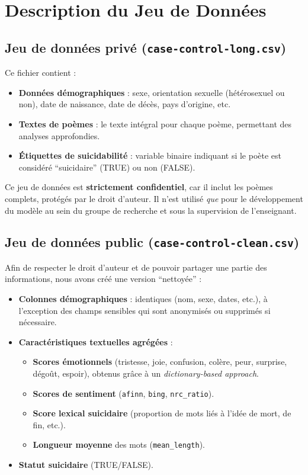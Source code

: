 \documentclass[12pt,a4paper]{article}
\begin{document}
	\section{Description du Jeu de Données}
	\label{sec:dataset_description}
	
	\subsection{Jeu de données privé (\texttt{case-control-long.csv})}
	Ce fichier contient :
	\begin{itemize}
		\item \textbf{Données démographiques} : sexe, orientation sexuelle (hétérosexuel 
		ou non), date de naissance, date de décès, pays d’origine, etc.
		\item \textbf{Textes de poèmes} : le texte intégral pour chaque poème, 
		permettant des analyses approfondies. 
		\item \textbf{Étiquettes de suicidabilité} : variable binaire indiquant si 
		le poète est considéré ``suicidaire'' (TRUE) ou non (FALSE).
	\end{itemize}
	
	Ce jeu de données est \textbf{strictement confidentiel}, car il inclut 
	les poèmes complets, protégés par le droit d’auteur. Il n’est utilisé 
	\textit{que} pour le développement du modèle au sein du groupe de recherche 
	et sous la supervision de l’enseignant.
	
	\subsection{Jeu de données public (\texttt{case-control-clean.csv})}
	Afin de respecter le droit d’auteur et de pouvoir partager une partie des informations, 
	nous avons créé une version ``nettoyée'' :
	\begin{itemize}
		\item \textbf{Colonnes démographiques} : identiques (nom, sexe, dates, etc.), 
		à l’exception des champs sensibles qui sont anonymisés ou supprimés 
		si nécessaire.
		\item \textbf{Caractéristiques textuelles agrégées} : 
		\begin{itemize}
			\item \textbf{Scores émotionnels} (tristesse, joie, confusion, colère, 
			peur, surprise, dégoût, espoir), obtenus grâce à un \textit{dictionary-based approach}.
			\item \textbf{Scores de sentiment} (\texttt{afinn}, \texttt{bing}, \texttt{nrc\_ratio}).
			\item \textbf{Score lexical suicidaire} (proportion de mots liés à l’idée 
			de mort, de fin, etc.).
			\item \textbf{Longueur moyenne} des mots (\texttt{mean\_length}).
		\end{itemize}
		\item \textbf{Statut suicidaire} (TRUE/FALSE).
	\end{itemize}
	
\end{document}
